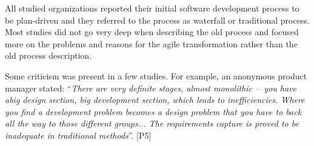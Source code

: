 All studied organizations reported their initial software development
process to be plan-driven and they referred to the process as waterfall
or traditional process. Most studies did not go very deep when
describing the old process and focused more on the problems and reasons
for the agile transformation rather than the old process description.

Some criticism was present in a few studies. For example, an anonymous
product manager stated: ``\textit{There are very definite stages, almost
monolithic – you have abig design section, big development section,
which leads to inefficiencies. Where you find a development problem
becomes a design problem that you have to back all the way to those
different groups... The requirements capture is proved to be inadequate
in traditional methods}''. [P5]
